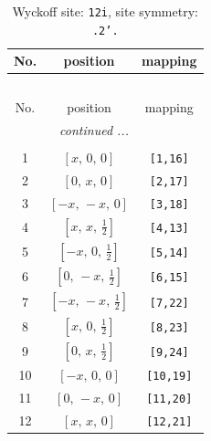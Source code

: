 \documentclass[fleqn,8pt]{jsarticle}
\begin{document}
\renewcommand{\arraystretch}{1.2}
\begin{longtable}{ccc}
\caption{Wyckoff site: {\tt 12i}, site symmetry: {\tt .2'.}}
 \\
 \hline \hline
No. & position & mapping \\ \hline \endfirsthead

\multicolumn{2}{l}{\tablename\ \thetable{}} \\
 \hline \hline
No. & position & mapping \\ \hline \endhead

 \hline \hline
\multicolumn{2}{r}{\footnotesize\it continued ...} \\ \endfoot

 \hline \hline
\multicolumn{2}{r}{} \\ \endlastfoot

1 & $\left[ x,\, 0,\, 0 \right]$ & {\tt [1,16]} \\ \hline
2 & $\left[ 0,\, x,\, 0 \right]$ & {\tt [2,17]} \\ \hline
3 & $\left[ - x,\, - x,\, 0 \right]$ & {\tt [3,18]} \\ \hline
4 & $\left[ x,\, x,\, \frac{1}{2} \right]$ & {\tt [4,13]} \\ \hline
5 & $\left[ - x,\, 0,\, \frac{1}{2} \right]$ & {\tt [5,14]} \\ \hline
6 & $\left[ 0,\, - x,\, \frac{1}{2} \right]$ & {\tt [6,15]} \\ \hline
7 & $\left[ - x,\, - x,\, \frac{1}{2} \right]$ & {\tt [7,22]} \\ \hline
8 & $\left[ x,\, 0,\, \frac{1}{2} \right]$ & {\tt [8,23]} \\ \hline
9 & $\left[ 0,\, x,\, \frac{1}{2} \right]$ & {\tt [9,24]} \\ \hline
10 & $\left[ - x,\, 0,\, 0 \right]$ & {\tt [10,19]} \\ \hline
11 & $\left[ 0,\, - x,\, 0 \right]$ & {\tt [11,20]} \\ \hline
12 & $\left[ x,\, x,\, 0 \right]$ & {\tt [12,21]} \\
\end{longtable}
\renewcommand{\arraystretch}{1.2}
\end{document}
